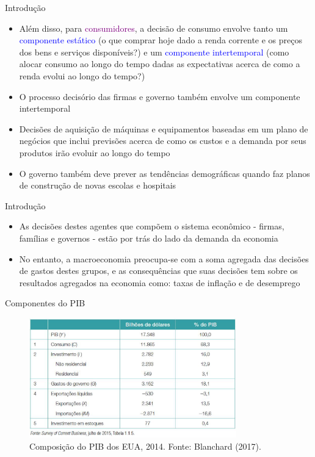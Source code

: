 \documentclass[10pt]{beamer}
\begin{document}
\begin{frame}{Introdução}
    \begin{itemize}
        \item Além disso, para \textcolor{purple}{consumidores}, a decisão de consumo envolve tanto um \textcolor{blue}{componente estático} (o que comprar hoje dado a renda corrente e os preços dos bens e serviços disponíveis?) e um \textcolor{blue}{componente intertemporal} (como alocar consumo ao longo do tempo dadas as expectativas acerca de como a renda evolui ao longo do tempo?)\bigskip
         
        \item O processo decisório das firmas e governo também envolve um componente intertemporal\bigskip
         
        \item Decisões de aquisição de máquinas e equipamentos baseadas em um plano de negócios que inclui previsões acerca de como os custos e a demanda por seus produtos irão evoluir ao longo do tempo\bigskip
         
        \item O governo também deve prever as tendências demográficas quando faz planos de construção de novas escolas e hospitais
    \end{itemize}
\end{frame}

\begin{frame}{Introdução}
    \begin{itemize}
        \item As decisões destes agentes  que compõem o sistema econômico - firmas, famílias e governos - estão por trás do lado da demanda da economia\bigskip
         
        \item No entanto, a macroeconomia preocupa-se com a soma agregada das decisões de gastos destes grupos, e as consequências que suas decisões tem sobre os resultados agregados na economia como: taxas de inflação e de desemprego
    \end{itemize}
\end{frame}

\begin{frame}{Componentes do PIB}
    \begin{figure}
        \centering
        \includegraphics[width=0.8\textwidth]{./figures/aula5_fig1.PNG}
        \caption{Composição do PIB dos EUA, 2014. Fonte: Blanchard (2017).}
        \label{aula5_fig1}
    \end{figure}
\end{frame}
\end{document}
